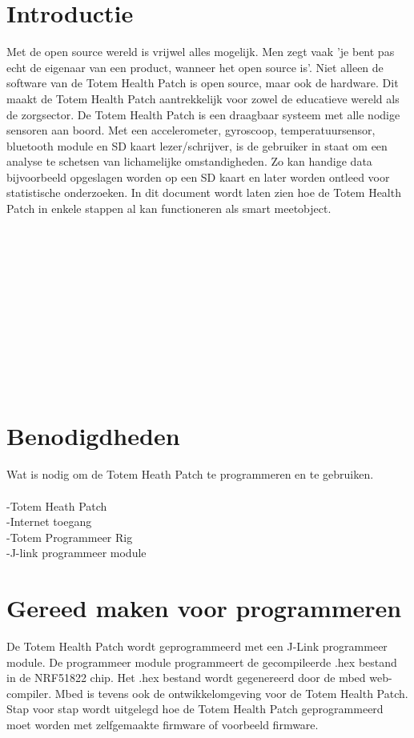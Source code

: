 \documentclass[conference]{IEEEtran}
\begin{document}
\section{Introductie}
Met de open source wereld is vrijwel alles mogelijk. Men zegt vaak  'je bent pas echt de eigenaar van een product, wanneer het open source is'. Niet alleen de software van de Totem Health Patch is open source, maar ook de hardware. Dit maakt de Totem Health Patch aantrekkelijk voor zowel de educatieve wereld als de zorgsector. De Totem Health Patch is een draagbaar systeem met alle nodige sensoren aan boord. Met een accelerometer, gyroscoop, temperatuursensor, bluetooth module en SD kaart lezer/schrijver, is de gebruiker in staat om een analyse te schetsen van lichamelijke omstandigheden. Zo kan handige data bijvoorbeeld opgeslagen worden op een SD kaart en later worden ontleed voor statistische onderzoeken. In dit document wordt laten zien hoe de Totem Health Patch in enkele stappen al kan functioneren als smart meetobject.\\\\\\\\\\\\\\\\\\\\\\\\   

\section{Benodigdheden}
Wat is nodig om de Totem Heath Patch te programmeren en te gebruiken.\\\\-Totem Heath Patch\\
-Internet toegang\\
-Totem Programmeer Rig\\
-J-link programmeer module\\

\section{Gereed maken voor programmeren}
De Totem Health Patch wordt geprogrammeerd met een J-Link programmeer module. De programmeer module programmeert de gecompileerde .hex bestand in de NRF51822 chip. Het .hex bestand wordt gegenereerd door de mbed web-compiler. Mbed is tevens ook de ontwikkelomgeving voor de Totem Health Patch. Stap voor stap wordt uitgelegd hoe de Totem Health Patch geprogrammeerd moet worden met zelfgemaakte firmware of voorbeeld firmware.
\end{document}
